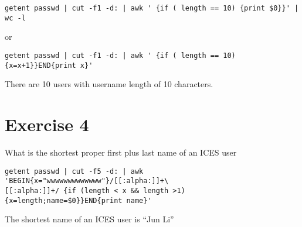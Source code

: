 \documentclass[letterpaper,10pt]{article}
\begin{document}
\begin{verbatim}
getent passwd | cut -f1 -d: | awk ' {if ( length == 10) {print $0}}' | wc -l
\end{verbatim}
or
\begin{verbatim}
getent passwd | cut -f1 -d: | awk ' {if ( length == 10) {x=x+1}}END{print x}'
\end{verbatim}
There are 10 users with username length of 10 characters.

\section*{Exercise 4}
What is the shortest proper first plus last name of an ICES user
\begin{verbatim}
getent passwd | cut -f5 -d: | awk 'BEGIN{x="wwwwwwwwwwwww"}/[[:alpha:]]+\
[[:alpha:]]+/ {if (length < x && length >1){x=length;name=$0}}END{print name}'
\end{verbatim}
The shortest name of an ICES user is ``Jun Li''
\end{document}
